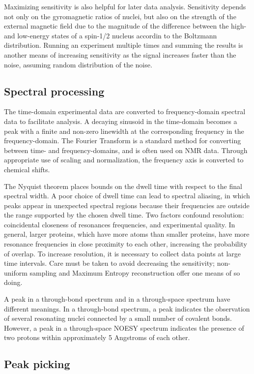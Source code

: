 Maximizing sensitivity is also helpful for later data analysis.
Sensitivity depends not only on the gyromagnetic ratios of nuclei, but also
on the strength of the external magnetic field due to the magnitude of the
difference between the high- and low-energy states of a spin-1/2 nucleus
accordin to the Boltzmann distribution.
Running an experiment multiple times and summing the results is another 
means of increasing sensitivity as the signal increases faster
than the noise, assuming random distribution of the noise.

\subsection*{Spectral processing}

The time-domain experimental data are converted to frequency-domain spectral
data to facilitate analysis.  A decaying sinusoid in the time-domain becomes
a peak with a finite and non-zero linewidth at the corresponding frequency
in the frequency-domain.  The Fourier Transform is a standard method for 
converting between time- and frequency-domains, and is often used on NMR data.
Through appropriate use of scaling and normalization, the frequency axis is
converted to chemical shifts.

The Nyquist theorem places bounds on the dwell time with respect to the 
final spectral width.  A poor choice of dwell time can lead to spectral 
aliasing, in which peaks appear in unexpected spectral regions because their
frequencies are outside the range supported by the chosen dwell time.
Two factors confound resolution:  coincidental
closeness of resonances frequencies, and experimental quality.  In general, 
larger proteins, which have more atoms than smaller proteins, have more resonance
frequencies in close proximity to each other, increasing the probability of 
overlap.  To increase resolution, it is necessary to collect data points at 
large time intervals.  Care must be taken to avoid decreasing the sensitivity;
non-uniform sampling and Maximum Entropy reconstruction offer one means of so
doing.

A peak in a through-bond spectrum and in a through-space spectrum have 
different meanings.  In a through-bond spectrum, a peak indicates the 
observation of several resonating nuclei connected by a small number of
covalent bonds.  However, a peak in a through-space NOESY spectrum indicates
the presence of two protons within approximately 5 Angstroms of each other.

\subsection*{Peak picking}

